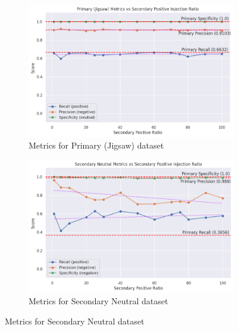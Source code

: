 \begin{figure}
    \centering
    \begin{subfigure}[b]{0.49\textwidth}
        \includegraphics[width=\textwidth]{graphs/ratio/combined/primary.png}
        \caption{Metrics for Primary (Jigsaw) dataset}
        \label{subfig:primary_metrics_comb}
    \end{subfigure}
    \hfill
    \begin{subfigure}[b]{0.49\textwidth}
        \includegraphics[width=\textwidth]{graphs/ratio/combined/sn.png}
        \caption{Metrics for Secondary Neutral dataset}
        \label{subfig:secondary_neutral_metrics_comb}
    \end{subfigure}

    \vspace{0.2cm}


\end{figure}
